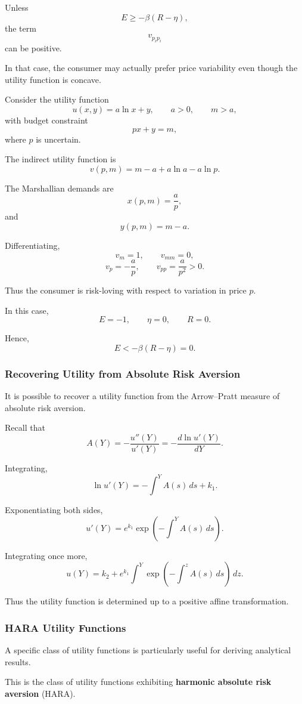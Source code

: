 Unless
\[
E\ge -\beta(R-\eta),
\]
the term
\[
v_{p_ip_i}
\]
can be positive.

In that case, the consumer may actually prefer price variability even though the utility function is concave.

Consider the utility function
\[
u(x,y)=a\ln x+y,
\qquad
a>0,
\qquad
m>a,
\]
with budget constraint
\[
px+y=m,
\]
where \(p\) is uncertain.

The indirect utility function is
\[
v(p,m)
=
m-a+a\ln a-a\ln p.
\]

The Marshallian demands are
\[
x(p,m)=\frac{a}{p},
\]
and
\[
y(p,m)=m-a.
\]

Differentiating,
\[
v_m=1,
\qquad
v_{mm}=0,
\]
\[
v_p=-\frac{a}{p},
\qquad
v_{pp}=\frac{a}{p^2}>0.
\]

Thus the consumer is risk-loving with respect to variation in price \(p\).

In this case,
\[
E=-1,
\qquad
\eta=0,
\qquad
R=0.
\]

Hence,
\[
E<-\beta(R-\eta)=0.
\]

\subsubsection{Recovering Utility from Absolute Risk Aversion}

It is possible to recover a utility function from the Arrow--Pratt measure of absolute risk aversion.

Recall that
\[
A(Y)
=
-\frac{u''(Y)}{u'(Y)}
=
-\frac{d\ln u'(Y)}{dY}.
\]

Integrating,
\[
\ln u'(Y)
=
-\int^Y A(s)\,ds + k_1.
\]

Exponentiating both sides,
\[
u'(Y)
=
e^{k_1}
\exp\left(
-\int^Y A(s)\,ds
\right).
\]

Integrating once more,
\[
u(Y)
=
k_2
+
e^{k_1}
\int^Y
\exp\left(
-\int^z A(s)\,ds
\right)\,dz.
\]

Thus the utility function is determined up to a positive affine transformation.

\subsubsection{HARA Utility Functions}

A specific class of utility functions is particularly useful for deriving analytical results.

This is the class of utility functions exhibiting \textbf{harmonic absolute risk aversion} (HARA).

